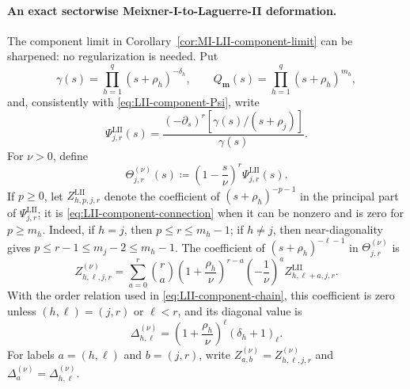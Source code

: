 \documentclass[10pt]{amsart}
\newcommand{\mm}{\boldsymbol m}
\theoremstyle{plain}
\theoremstyle{definition}
\theoremstyle{remark}
\begin{document}
\paragraph{An exact sectorwise Meixner-I-to-Laguerre-II deformation.}
The component limit in Corollary~\ref{cor:MI-LII-component-limit} can be
sharpened: no regularization is needed. Put
\[
 \gamma(s)=\prod_{h=1}^q(s+\rho_h)^{-\delta_h},\qquad
 Q_{\mm}(s)=\prod_{h=1}^q(s+\rho_h)^{m_h},
\]
and, consistently with \eqref{eq:LII-component-Psi}, write
\[
 \Psi_{j,r}^{\mathrm{LII}}(s)
 =\frac{(-\partial_s)^r[\gamma(s)/(s+\rho_j)]}{\gamma(s)}.
\]
For \(\nu>0\), define
\begin{equation}
 \Theta_{j,r}^{(\nu)}(s)
 \coloneq\left(1-\frac{s}{\nu}\right)^r
 \Psi_{j,r}^{\mathrm{LII}}(s).
 \label{eq:MI-LII-deformed-basis}
\end{equation}
If \(p\ge0\), let \(Z_{h,p,j,r}^{\mathrm{LII}}\) denote the coefficient
of \((s+\rho_h)^{-p-1}\) in the principal part of
\(\Psi_{j,r}^{\mathrm{LII}}\); it is
\eqref{eq:LII-component-connection} when it can be nonzero and is zero
for \(p\ge m_h\). Indeed, if \(h=j\), then
\(p\le r\le m_h-1\); if \(h\ne j\), then near-diagonality gives
\(p\le r-1\le m_j-2\le m_h-1\). The coefficient of
\((s+\rho_h)^{-\ell-1}\) in \(\Theta_{j,r}^{(\nu)}\) is
\begin{equation}
 Z_{h,\ell,j,r}^{(\nu)}
 =\sum_{a=0}^{r}\binom ra
 \left(1+\frac{\rho_h}{\nu}\right)^{r-a}
 \left(-\frac1\nu\right)^a
 Z_{h,\ell+a,j,r}^{\mathrm{LII}}.
 \label{eq:MI-LII-deformed-connection}
\end{equation}
With the order relation used in
\eqref{eq:LII-component-chain}, this coefficient is zero unless
\((h,\ell)=(j,r)\) or \(\ell<r\), and its diagonal value is
\begin{equation}
 \Delta_{h,\ell}^{(\nu)}
 =\left(1+\frac{\rho_h}{\nu}\right)^\ell
   (\delta_h+1)_\ell .
 \label{eq:MI-LII-deformed-pivots}
\end{equation}
For labels \(a=(h,\ell)\) and \(b=(j,r)\), write
\(Z_{a,b}^{(\nu)}=Z_{h,\ell,j,r}^{(\nu)}\) and
\(\Delta_a^{(\nu)}=\Delta_{h,\ell}^{(\nu)}\).
\end{document}
